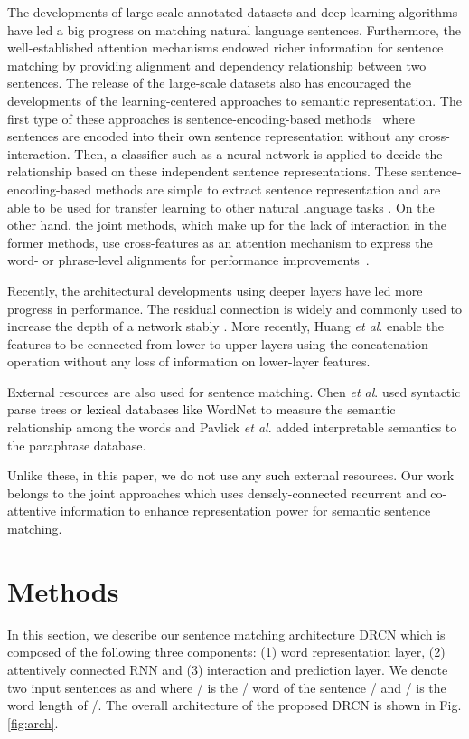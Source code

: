 \documentclass[letterpaper]{article} \usepackage{aaai19}  \usepackage{times}  \usepackage{helvet}  \usepackage{courier}  \usepackage{url}  \usepackage{graphicx}  \frenchspacing  \setlength{\pdfpagewidth}{8.5in}  \setlength{\pdfpageheight}{11in}
\newcommand\sh[1]{\textcolor{black}{#1}}
\newcommand{\etal}{\textit{et al}. }
\begin{document}
The developments of large-scale annotated datasets \cite{snliemnlp2015,williams2017broad} and deep learning algorithms have led a big progress on matching natural language sentences. Furthermore, the well-established attention mechanisms endowed richer information for sentence matching by providing alignment and dependency relationship between two sentences.
The release of the large-scale datasets also has encouraged the developments of the learning-centered approaches to semantic representation. The first type of these approaches is sentence-encoding-based methods~\cite{conneau2017supervised,choi2017learning,nie2017shortcut,shen2018reinforced} where sentences are encoded into their own sentence representation without any cross-interaction. Then, a classifier such as a neural network is applied to decide the relationship based on these independent sentence representations. These sentence-encoding-based methods are simple to extract sentence representation and are able to be used for transfer learning to other natural language tasks \cite{conneau2017supervised}. On the other hand, the joint methods, which make up for the lack of interaction in the former methods, use cross-features as an attention mechanism to express the word- or phrase-level alignments for performance improvements~\cite{wang2017bilateral,chen2017enhanced,gong2018natural,yang2016anmm}.

Recently, the architectural developments using deeper layers have led more progress in performance. The residual connection is widely and commonly used to increase the depth of a network stably \cite{he2016deep,wu2016gnmt}.
More recently, Huang \etal \cite{huang2017densely} enable the features to be connected from lower to upper layers using the concatenation operation without any loss of information on lower-layer features.

External resources are also used for sentence matching. Chen \etal \cite{chen2017natural,chen2017enhanced} used syntactic parse trees or \sh{lexical databases like} WordNet to measure the semantic relationship among the words and Pavlick \etal \cite{pavlick2015adding} added interpretable semantics to the paraphrase database.

Unlike these, in this paper, we do not use any \sh{such} external resources.
Our work belongs to the joint approaches 
which uses densely-connected recurrent and co-attentive information to enhance representation power for semantic sentence matching.


\section{Methods}
\label{sec:method}
In this section, we describe our sentence matching architecture DRCN which is composed of the following three components: (1) word representation layer, (2) attentively connected RNN and (3) interaction and prediction layer. We denote two input sentences as  and  where / is the / word of the sentence / and / is the word length of /. 
The overall architecture of the proposed DRCN is shown in Fig. \ref{fig:arch}.
\end{document}

